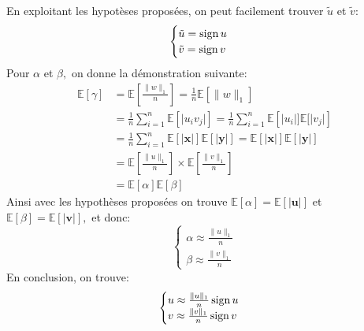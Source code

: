 En exploitant les hypotèses proposées, on peut facilement trouver $\tilde{u}$ et $\tilde{v}$:
\begin{equation}\label{XnorNet:InnerProductQuantification:Binarisatiosn}
	\begin{cases}
		\tilde{u} = \operatorname{sign} u\\
		\tilde{v} = \operatorname{sign} v
	\end{cases}
\end{equation}
Pour $\alpha$ et $\beta,$ on donne la démonstration suivante:
\begin{align*}
	\mathbb{E}[\gamma] &= \mathbb{E}\left[\frac{\lVert w \rVert_1}{n}\right] = \frac{1}{n}\mathbb{E}\left[\lVert  w \rVert_1\right] \\
	&= \frac{1}{n}\sum_{i=1}^n\mathbb{E}\left[\lvert  u_i v_j \rvert\right] = \frac{1}{n}\sum_{i=1}^n \mathbb{E}\left[\lvert  u_i \rvert]\mathbb{E}[\lvert  v_j \rvert\right] \\
	&= \frac{1}{n}\sum_{i=1}^n \mathbb{E}\left[\lvert  \boldsymbol{x} \rvert\right]\mathbb{E}\left[\lvert \boldsymbol{y} \rvert\right] = \mathbb{E}\left[\lvert  \boldsymbol{x} \rvert\right]\mathbb{E}\left[\lvert \boldsymbol{y} \rvert\right]\\
	&= \mathbb{E}\left[\frac{\lVert u \rVert_1}{n}\right] \times \mathbb{E}\left[\frac{\lVert v \rVert_1}{n}\right]\\
	&= \mathbb{E}\left[\alpha \right]\mathbb{E}\left[\beta \right]
\end{align*}  
Ainsi avec les hypothèses proposées on trouve $\mathbb{E}\left[\alpha \right]=\mathbb{E}\left[\lvert  \boldsymbol{u} \rvert\right]$ et $\mathbb{E}\left[\beta \right]=\mathbb{E}\left[\lvert  \boldsymbol{v} \rvert\right],$ et donc: 
\begin{equation} \label{XnorNet:InnerProductQuantification:ScaleFactors}
	\begin{cases}
		\alpha \approx \frac{\lVert u \rVert_1}{n}\\
		\beta \approx \frac{\lVert v \rVert_1}{n}
	\end{cases}
\end{equation}
\newline En conclusion, on trouve\cite{XnorNetPaper}:
\begin{equation} \label{XnorNet:InnerProductQuantification:Result}
	\begin{cases}
		u \approx \frac{\lVert u \rVert_1}{n}\operatorname{sign} u \\
		v \approx \frac{\lVert v \rVert_1}{n}\operatorname{sign} v
	\end{cases}
\end{equation}

